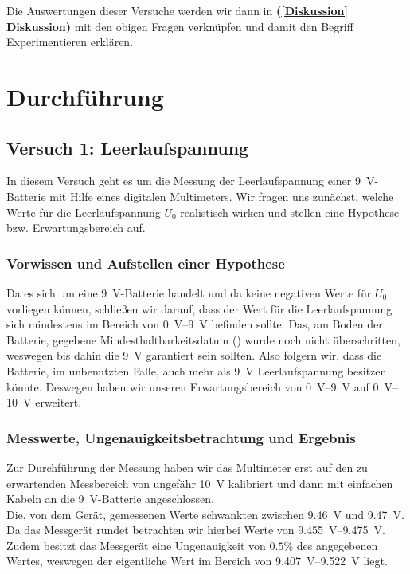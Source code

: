 \documentclass[11pt,a4paper,titlepage, ngerman]{article}
\begin{document}
			Die Auswertungen dieser Versuche werden wir dann in \textbf{(\ref{Diskussion} Diskussion)} mit den obigen Fragen verknüpfen und damit den Begriff \glqq Experimentieren\grqq {} erklären.
	
	\newpage
	\section{Durchführung}
		\label{Durchführung}
		
		\vfill
		\subsection{Versuch 1: Leerlaufspannung}
			\label{2.1}
			
			In diesem Versuch geht es um die Messung der Leerlaufspannung einer \SI{9}{\V}-Batterie mit Hilfe eines digitalen Multimeters. Wir fragen uns zunächst, welche Werte für die Leerlaufspannung $U_0$ realistisch wirken und stellen eine Hypothese bzw. Erwartungsbereich auf.
			
			\vfill
			\subsubsection{Vorwissen und Aufstellen einer Hypothese}
				\label{2.1.1}
				
				Da es sich um eine \SI{9}{\V}-Batterie handelt und da keine negativen Werte für $U_0$ vorliegen können, schließen wir darauf, dass der Wert für die Leerlaufspannung sich mindestens im Bereich von \SIrange{0}{9}{\V} befinden sollte.
				Das, am Boden der Batterie, gegebene Mindesthaltbarkeitsdatum (\grqq) wurde noch nicht überschritten, weswegen bis dahin die \SI{9}{\V} garantiert sein sollten. Also folgern wir, dass die Batterie, im unbenutzten Falle, auch mehr als \SI{9}{\V} Leerlaufspannung besitzen könnte.
				Deswegen haben wir unseren Erwartungsbereich von \SIrange{0}{9}{\V} auf \SIrange{0}{10}{\V} erweitert. 
			
			\vfill
			\subsubsection{Messwerte, Ungenauigkeitsbetrachtung und Ergebnis}
				\label{2.1.2}
				
				Zur Durchführung der Messung haben wir das Multimeter erst auf den zu erwartenden Messbereich von ungefähr \SI{10}{\V} kalibriert und dann mit einfachen Kabeln an die \SI{9}{\V}-Batterie angeschlossen. \\			
				Die, von dem Gerät, gemessenen Werte schwankten zwischen \SI{9,46}{\V} und \SI{9,47}{\V}.
				Da das Messgerät rundet betrachten wir hierbei Werte von \SIrange{9,455}{9,475}{\V}.
				Zudem besitzt das Messgerät eine Ungenauigkeit von $0.5\%$ des angegebenen Wertes, weswegen der eigentliche Wert im Bereich von \SIrange{9,407}{9,522}{\V} liegt.
			
\end{document}
